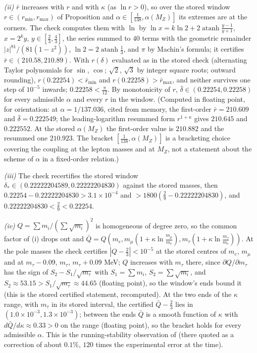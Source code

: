 \emph{(ii)} $\bar{r}$ increases with $r$ and with $\kappa$ (as $\ln r > 0$), so over the stored window $r \in (r_{\min}, r_{\max})$ of Proposition  and $\alpha \in [\tfrac{1}{138}, \alpha(M_{Z})]$ its extremes are at the corners. The check computes them with $\ln$ by $\ln x = k\ln 2 + 2\operatorname{atanh}\tfrac{y - 1}{y + 1}$, $x = 2^{k}y$, $y \in [\tfrac23, \tfrac43]$, the series summed to $40$ terms with the geometric remainder $|z|^{81}/(81(1 - z^{2}))$, $\ln 2 = 2\operatorname{atanh}\tfrac13$, and $\pi$ by Machin's formula; it certifies $\bar{r} \in (210.58, 210.89)$. With $r(\delta)$ evaluated as in the stored check (alternating Taylor polynomials for $\sin$, $\cos$; $\sqrt2$, $\sqrt3$ by integer square roots; outward rounding), $r(0.22254) < \bar{r}_{\min}$ and $r(0.22258) > \bar{r}_{\max}$, and neither survives one step of $10^{-5}$ inwards; $0.22258 < \tfrac{\pi}{12}$. By monotonicity of $r$, $\bar{\delta} \in (0.22254, 0.22258)$ for every admissible $\alpha$ and every $r$ in the window. (Computed in floating point, for orientation: at $\alpha = 1/137.036$, cited from memory, the first-order $\bar{r} = 210.609$ and $\bar{\delta} = 0.222549$; the leading-logarithm resummed form $r^{1 + \kappa}$ gives $210.645$ and $0.222552$. At the stored $\alpha(M_{Z})$ the first-order value is $210.882$ and the resummed one $210.923$. The bracket $[\tfrac{1}{138}, \alpha(M_{Z})]$ is a bracketing choice covering the coupling at the lepton masses and at $M_{Z}$, not a statement about the scheme of $\alpha$ in a fixed-order relation.)

\emph{(iii)} The check recertifies the stored window $\delta_{*} \in (0.22222204589, 0.22222204830)$ against the stored masses, then $0.22254 - 0.22222204830 > 3.1 \times 10^{-4}$ and $> 1800(\tfrac29 - 0.22222204830)$, and $0.22222204830 < \tfrac29 < 0.22254$.

\emph{(iv)} $Q = \sum m_{i}/(\sum\sqrt{m_{i}})^{2}$ is homogeneous of degree zero, so the common factor of (i) drops out and $\bar{Q} = Q(m_{e}, m_{\mu}(1 + \kappa\ln\tfrac{m_{\mu}}{m_{e}}), m_{\tau}(1 + \kappa\ln\tfrac{m_{\tau}}{m_{e}}))$. At the pole masses the check certifies $|Q - \tfrac23| < 10^{-5}$ at the stored centres of $m_{e}$, $m_{\mu}$ and at $m_{\tau} - 0.09$, $m_{\tau}$, $m_{\tau} + 0.09$ MeV; $Q$ increases with $m_{\tau}$ there, since $\partial Q/\partial m_{\tau}$ has the sign of $S_{2} - S_{1}/\sqrt{m_{\tau}}$ with $S_{1} = \sum m_{i}$, $S_{2} = \sum\sqrt{m_{i}}$, and $S_{2} \approx 53.15 > S_{1}/\sqrt{m_{\tau}} \approx 44.65$ (floating point), so the window's ends bound it (this is the stored certified statement, recomputed). At the two ends of the $\kappa$ range, with $m_{\tau}$ in its stored interval, the certified $\bar{Q} - \tfrac23$ lies in $(1.0 \times 10^{-3}, 1.3 \times 10^{-3})$; between the ends $\bar{Q}$ is a smooth function of $\kappa$ with $d\bar{Q}/d\kappa \approx 0.33 > 0$ on the range (floating point), so the bracket holds for every admissible $\alpha$. This is the running-stability observation of \cite{Sumino2009} (there quoted as a correction of about $0.1\%$, $120$ times the experimental error at the time).

